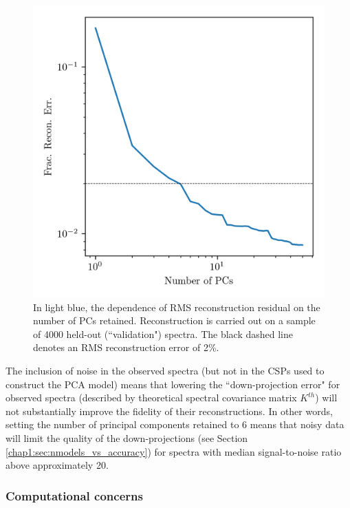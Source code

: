 \begin{figure}
    \centering
    \includegraphics[width=\columnwidth]{xval_test}
    \caption[Fractional reconstruction residual for validation data]{In light blue, the dependence of RMS reconstruction residual on the number of PCs retained. Reconstruction is carried out on a sample of 4000 held-out (``validation") spectra. The black dashed line denotes an RMS reconstruction error of 2\%.}
    \label{fig:xval_q}
\end{figure}

The inclusion of noise in the observed spectra (but not in the CSPs used to construct the PCA model) means that lowering the ``down-projection error" for observed spectra (described by theoretical spectral covariance matrix $K^{th}$) will not substantially improve the fidelity of their reconstructions. In other words, setting the number of principal components retained to 6 means that noisy data will limit the quality of the down-projections (see Section \ref{chap1:sec:nmodels_vs_accuracy}) for spectra with median signal-to-noise ratio above approximately 20.

\subsubsection{Computational concerns}

